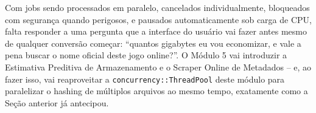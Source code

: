 \begin{CaixaResumo}
Com jobs sendo processados em paralelo, cancelados individualmente, bloqueados com segurança quando perigosos, e pausados automaticamente sob carga de CPU, falta responder a uma pergunta que a interface do usuário vai fazer antes mesmo de qualquer conversão começar: ``quantos gigabytes eu vou economizar, e vale a pena buscar o nome oficial deste jogo online?''. O Módulo 5 vai introduzir a Estimativa Preditiva de Armazenamento e o Scraper Online de Metadados -- e, ao fazer isso, vai reaproveitar a \texttt{concurrency::ThreadPool} deste módulo para paralelizar o hashing de múltiplos arquivos ao mesmo tempo, exatamente como a Seção anterior já antecipou.
\end{CaixaResumo}
